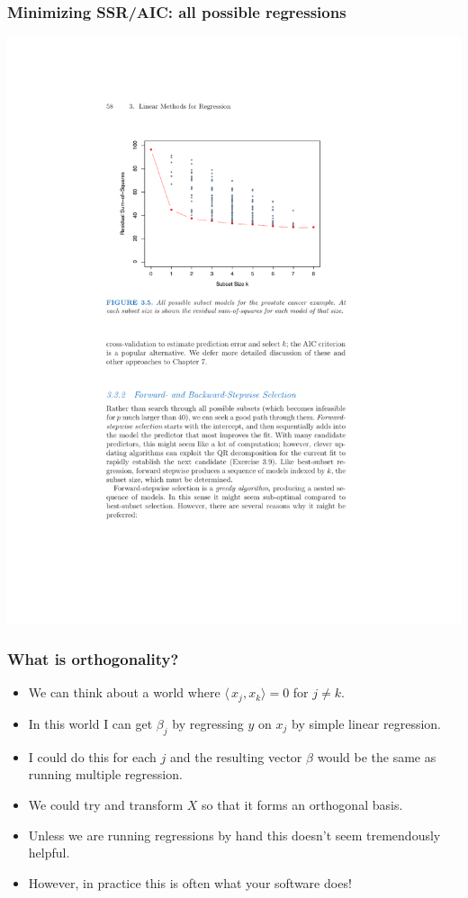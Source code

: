 \documentclass[xcolor=pdftex,dvipsnames,table,mathserif,aspectratio=169]{beamer}
\begin{document}
\begin{frame}
\frametitle{Minimizing SSR/AIC: all possible regressions}
\begin{center}
\includegraphics[height=\textheight]{./resources/subsetsaic}
\end{center}
\end{frame}

\begin{frame}
\frametitle{What is orthogonality?}
\begin{itemize}
\item We can think about a world where $\langle\, x_j, x_k \rangle =0$ for $j \neq k$.
\item In this world I can get $\beta_j$ by regressing $y$ on $x_j$ by simple linear regression.
\item I could do this for each $j$ and the resulting vector $\beta$ would be the same as running multiple regression.
\item We could try and transform $X$ so that it forms an \alert{orthogonal basis}.
\item Unless we are running regressions by hand this doesn't seem tremendously helpful.
\item However, in practice this is often what your software does!
\end{itemize}
\end{frame}
\end{document}
